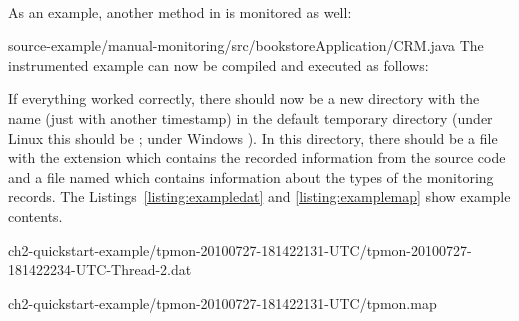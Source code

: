 \quad\\

\noindent As an example, another method in  is monitored as well:

\setJavaCodeListing
%
{source-example/manual-monitoring/src/bookstoreApplication/CRM.java}
The instrumented example can now be compiled and executed as follows:

\setBashListing 		
	




\noindent If everything worked correctly, there should now be a new directory with the %
name  (just with another timestamp) in the default %
temporary directory (under Linux this should be ; under Windows %
). In this directory, there should be a file with the extension %
 which contains the recorded information from the source code and %
a file named  which contains information about the types of the %
monitoring records. %
The Listings~\ref{listing:exampledat} and \ref{listing:examplemap} show example %
contents. 
\begin{figure}[H]
\begin{graybox}
\end{graybox}
\end{figure}

\setBashListing
%
{ch2-quickstart-example/tpmon-20100727-181422131-UTC/tpmon-20100727-181422234-UTC-Thread-2.dat}

%
{ch2-quickstart-example/tpmon-20100727-181422131-UTC/tpmon.map}

